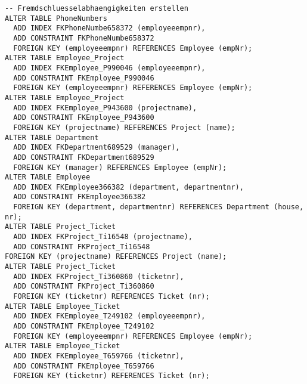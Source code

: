 \documentclass[11pt,a4paper,DIV=9]{scrartcl}
\begin{document}
\begin{lstlisting}
-- Fremdschluesselabhaengigkeiten erstellen
ALTER TABLE PhoneNumbers
  ADD INDEX FKPhoneNumbe658372 (employeeempnr),
  ADD CONSTRAINT FKPhoneNumbe658372
  FOREIGN KEY (employeeempnr) REFERENCES Employee (empNr);
ALTER TABLE Employee_Project
  ADD INDEX FKEmployee_P990046 (employeeempnr),
  ADD CONSTRAINT FKEmployee_P990046
  FOREIGN KEY (employeeempnr) REFERENCES Employee (empNr);
ALTER TABLE Employee_Project
  ADD INDEX FKEmployee_P943600 (projectname),
  ADD CONSTRAINT FKEmployee_P943600
  FOREIGN KEY (projectname) REFERENCES Project (name);
ALTER TABLE Department
  ADD INDEX FKDepartment689529 (manager),
  ADD CONSTRAINT FKDepartment689529
  FOREIGN KEY (manager) REFERENCES Employee (empNr);
ALTER TABLE Employee
  ADD INDEX FKEmployee366382 (department, departmentnr),
  ADD CONSTRAINT FKEmployee366382
  FOREIGN KEY (department, departmentnr) REFERENCES Department (house, nr);
ALTER TABLE Project_Ticket
  ADD INDEX FKProject_Ti16548 (projectname),
  ADD CONSTRAINT FKProject_Ti16548
FOREIGN KEY (projectname) REFERENCES Project (name);
ALTER TABLE Project_Ticket
  ADD INDEX FKProject_Ti360860 (ticketnr),
  ADD CONSTRAINT FKProject_Ti360860
  FOREIGN KEY (ticketnr) REFERENCES Ticket (nr);
ALTER TABLE Employee_Ticket
  ADD INDEX FKEmployee_T249102 (employeeempnr),
  ADD CONSTRAINT FKEmployee_T249102
  FOREIGN KEY (employeeempnr) REFERENCES Employee (empNr);
ALTER TABLE Employee_Ticket
  ADD INDEX FKEmployee_T659766 (ticketnr),
  ADD CONSTRAINT FKEmployee_T659766
  FOREIGN KEY (ticketnr) REFERENCES Ticket (nr);
\end{lstlisting}
\end{document}
